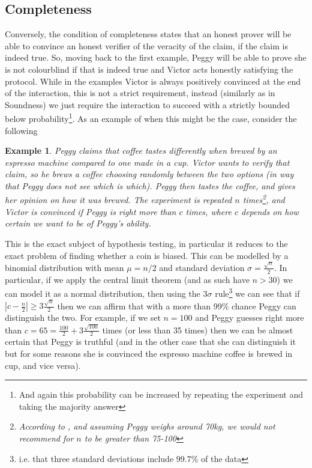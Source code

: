 \documentclass{article}
\newtheorem{example}{Example}
\begin{document}
\subsection{Completeness}
Conversely, the condition of completeness states that an honest prover will be able to convince an honest verifier of the veracity of the claim, if the claim is indeed true. So, moving back to the first example, Peggy will be able to prove she is not colourblind if that is indeed true and Victor acts honestly satisfying the protocol. While in the examples Victor is always positively convinced at the end of the interaction, this is not a strict requirement, instead (similarly as in Soundness) we just require the interaction to succeed with a strictly bounded below probability\footnote{And again this probability can be increased by repeating the experiment and taking the majority answer}. As an example of when this might be the case, consider the following \begin{example}
    Peggy claims that coffee tastes differently when brewed by an espresso machine compared to one made in a cup. Victor wants to verify that claim, so he brews a coffee choosing randomly between the two options (in way that Peggy does not see which is which). Peggy then tastes the coffee, and gives her opinion on how it was brewed. The experiment is repeated $n$ times\footnote{According to \cite{chambersChemIDplus0000302272XFSBVAOIAHNAPCNPVHKAFCSAN}, and assuming Peggy weighs around 70kg, we would not recommend for $n$ to be greater than 75-100}, and Victor is convinced if Peggy is right more than $c$ times, where $c$ depends on how certain we want to be of Peggy's ability.
\end{example}

This is the exact subject of hypothesis testing, in particular it reduces to the exact problem of finding whether a coin is biased. This can be modelled by a binomial distribution with mean $\mu = n/2$ and standard deviation $\sigma = \frac{\sqrt{n}}{2}$. In particular, if we apply the central limit theorem (and as such have $n > 30$) we can model it as a normal distribution, then using the $3\sigma$ rule\footnote{i.e. that three standard deviations include 99.7\% of the data} we can see that if $|c - \frac{n}{2}| \geq 3\frac{\sqrt{n}}{2}$ then we can affirm that with a more than 99\% chance Peggy can distinguish the two. For example, if we set $n = 100$ and Peggy guesses right more than $c = 65 = \frac{100}{2} + 3 \frac{\sqrt{100}}{2}$ times (or less than 35 times) then we can be almost certain that Peggy is truthful (and in the other case that she can distinguish it but for some reasons she is convinced the espresso machine coffee is brewed in cup, and vice versa).
\end{document}
